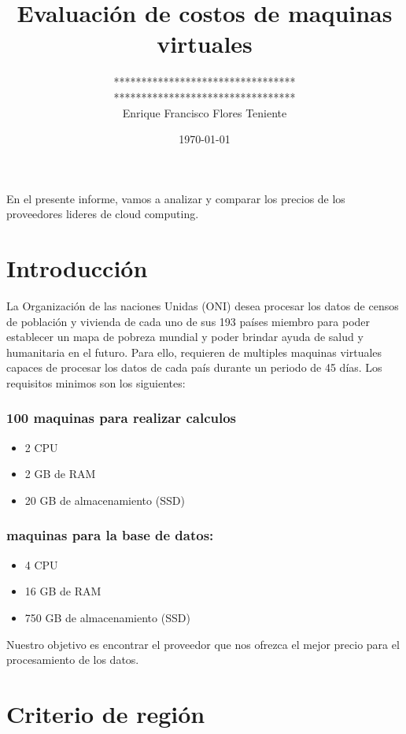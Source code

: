 \documentclass{article}
\title{Evaluación de costos de maquinas virtuales}
\date{\today}
\author{
    ********************************* \\
    ********************************* \\
    Enrique Francisco Flores Teniente
  }
\affil{UTEC}
\begin{document}
\maketitle

En el presente informe, vamos a analizar y comparar los precios de los proveedores lideres de cloud computing.

\tableofcontents
\newpage

\section{Introducción}

La Organización de las naciones Unidas (ONI) desea
procesar los datos de censos de población y vivienda de
cada uno de sus 193 países miembro para poder establecer
un mapa de pobreza mundial y poder brindar ayuda de
salud y humanitaria en el futuro. Para ello, requieren de multiples maquinas virtuales capaces de procesar los datos de cada país durante un periodo de 45 días.
Los requisitos minimos son los siguientes:

\subsubsection*{100 maquinas para realizar calculos}
  \begin{itemize}
    \item 2 CPU
    \item 2 GB de RAM
    \item 20 GB de almacenamiento (SSD)
  \end{itemize}

\subsubsection*{maquinas para la base de datos:}
  \begin{itemize}
    \item 4 CPU
    \item 16 GB de RAM
    \item 750 GB de almacenamiento (SSD)
  \end{itemize}

Nuestro objetivo es encontrar el proveedor que nos ofrezca el mejor precio para el procesamiento de los datos.

\section{Criterio de región}
\end{document}
